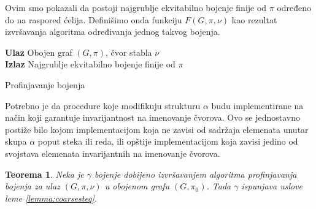 \documentclass[12pt,oneside]{memoir}
\newtheorem{theorem}{Teorema}
\theoremstyle{definition}
\begin{document}
  
  Ovim smo pokazali da postoji najgrublje ekvitabilno bojenje finije od $\pi$
  određeno do na raspored ćelija. Definišimo onda funkciju $F(G, \pi, \nu)$ kao
  rezultat izvršavanja algoritma određivanja jednog takvog bojenja.

  \begin{algorithm}[H]
	  \textbf{Ulaz} Obojen graf $(G, \pi)$, čvor stabla $\nu$\\
	  \textbf{Izlaz} Najgrublje ekvitabilno bojenje finije od $\pi$
	  \caption{Profinjavanje bojenja}
	  \begin{algorithmic}[1]
		  \State {$\alpha \gets \emptyset$}
		  \Else
		  \EndIf
		  \While{$\alpha \neq \emptyset$}
			  \Else
			  \EndIf
			\EndFor
		  \EndWhile
		  \State \Return{$\pi$}
		  \EndProcedure
	  \end{algorithmic}
  \end{algorithm}

  Potrebno je da procedure koje modifikuju strukturu $\alpha$ budu
  implementirane na način koji garantuje invarijantnost na imenovanje čvorova.
  Ovo se jednostavno postiže bilo kojom implementacijom koja ne zavisi od
  sadržaja elemenata unutar skupa $\alpha$ poput steka ili reda, ili opštije
  implementacijom koja zavisi jedino od svojstava elemenata invarijantnih
  na imenovanje čvorova.

  \begin{theorem}
	  Neka je $\gamma$ bojenje dobijeno izvršavanjem algoritma profinjavanja
	  bojenja za ulaz $(G, \pi, \nu)$ u obojenom grafu $(G, \pi_0)$. Tada
	  $\gamma$ ispunjava uslove leme \ref{lemma:coarsesteq}.
  \end{theorem}
\end{document}
